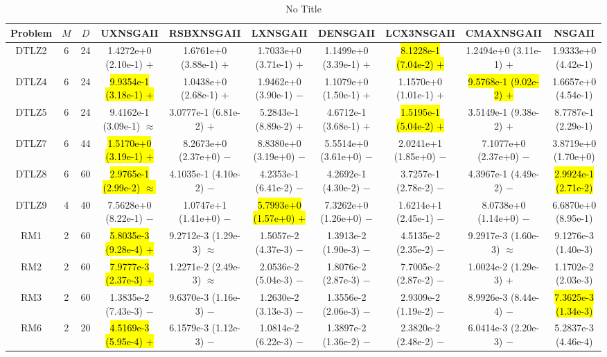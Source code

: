 \documentclass[journal]{IEEEtran}
\begin{document}
\begin{table*}[htbp]
\renewcommand{\arraystretch}{1.2}
\centering
\caption{No Title}
\begin{tabular}{cccccccccc}
\toprule
Problem&$M$&$D$&UXNSGAII&RSBXNSGAII&LXNSGAII&DENSGAII&LCX3NSGAII&CMAXNSGAII&NSGAII\\
\midrule
\multirow{1}{*}{DTLZ2}&6&24&1.4272e+0 (2.10e-1) $+$&1.6761e+0 (3.88e-1) $+$&1.7033e+0 (3.71e-1) $+$&1.1499e+0 (3.39e-1) $+$&\hl{8.1228e-1 (7.04e-2) $+$}&1.2494e+0 (3.11e-1) $+$&1.9333e+0 (4.42e-1)\\
\hline
\multirow{1}{*}{DTLZ4}&6&24&\hl{9.9354e-1 (3.18e-1) $+$}&1.0438e+0 (2.68e-1) $+$&1.9462e+0 (3.90e-1) $-$&1.1079e+0 (1.50e-1) $+$&1.1570e+0 (1.01e-1) $+$&\hl{9.5768e-1 (9.02e-2) $+$}&1.6657e+0 (4.54e-1)\\
\hline
\multirow{1}{*}{DTLZ5}&6&24&9.4162e-1 (3.09e-1) $\approx$&3.0777e-1 (6.81e-2) $+$&5.2843e-1 (8.89e-2) $+$&4.6712e-1 (3.68e-1) $+$&\hl{1.5195e-1 (5.04e-2) $+$}&3.5149e-1 (9.38e-2) $+$&8.7787e-1 (2.29e-1)\\
\hline
\multirow{1}{*}{DTLZ7}&6&44&\hl{1.5170e+0 (3.19e-1) $+$}&8.2673e+0 (2.37e+0) $-$&8.8380e+0 (3.19e+0) $-$&5.5514e+0 (3.61e+0) $-$&2.0241e+1 (1.85e+0) $-$&7.1077e+0 (2.37e+0) $-$&3.8719e+0 (1.70e+0)\\
\hline
\multirow{1}{*}{DTLZ8}&6&60&\hl{2.9765e-1 (2.99e-2) $\approx$}&4.1035e-1 (4.10e-2) $-$&4.2353e-1 (6.41e-2) $-$&4.2692e-1 (4.30e-2) $-$&3.7257e-1 (2.78e-2) $-$&4.3967e-1 (4.49e-2) $-$&\hl{2.9924e-1 (2.71e-2)}\\
\hline
\multirow{1}{*}{DTLZ9}&4&40&7.5628e+0 (8.22e-1) $-$&1.0747e+1 (1.41e+0) $-$&\hl{5.7993e+0 (1.57e+0) $+$}&7.3262e+0 (1.26e+0) $-$&1.6214e+1 (2.45e-1) $-$&8.0738e+0 (1.14e+0) $-$&6.6870e+0 (8.95e-1)\\
\hline
\multirow{1}{*}{RM1}&2&60&\hl{5.8035e-3 (9.28e-4) $+$}&9.2712e-3 (1.29e-3) $\approx$&1.5057e-2 (4.37e-3) $-$&1.3913e-2 (1.90e-3) $-$&4.5135e-2 (2.35e-2) $-$&9.2917e-3 (1.60e-3) $\approx$&9.1276e-3 (1.40e-3)\\
\hline
\multirow{1}{*}{RM2}&2&60&\hl{7.9777e-3 (2.37e-3) $+$}&1.2271e-2 (2.49e-3) $\approx$&2.0536e-2 (5.04e-3) $-$&1.8076e-2 (2.87e-3) $-$&7.7005e-2 (2.87e-2) $-$&1.0024e-2 (1.29e-3) $+$&1.1702e-2 (2.03e-3)\\
\hline
\multirow{1}{*}{RM3}&2&60&1.3835e-2 (7.43e-3) $-$&9.6370e-3 (1.16e-3) $-$&1.2630e-2 (3.13e-3) $-$&1.3556e-2 (2.06e-3) $-$&2.9309e-2 (1.19e-2) $-$&8.9926e-3 (8.44e-4) $-$&\hl{7.3625e-3 (1.34e-3)}\\
\hline
\multirow{1}{*}{RM6}&2&20&\hl{4.5169e-3 (5.95e-4) $+$}&6.1579e-3 (1.12e-3) $-$&1.0814e-2 (6.22e-3) $-$&1.3897e-2 (1.36e-2) $-$&2.3820e-2 (2.48e-2) $-$&6.0414e-3 (2.20e-3) $-$&5.2837e-3 (4.46e-4)\\

\end{tabular}
\end{table*}
\end{document}
